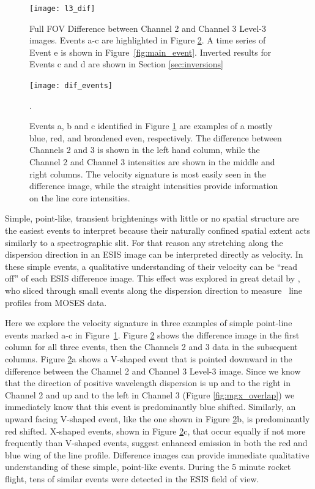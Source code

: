    		\begin{figure}[htb!]
   			\centering
   			\texttt{[image: l3\_dif]}
   			\caption{Full FOV Difference between Channel 2 and Channel 3 Level-3 images.  Events a-c are highlighted in Figure \ref{fig:dif_events}.  A time series of Event e is shown in Figure~\ref{fig:main_event}.  Inverted results for Events c and d are shown in Section \ref{sec:inversions}}
   			\label{fig:l3_dif}
   		\end{figure}
   	
 		\begin{figure}[htb!]
   			\centering
   			\texttt{[image: dif\_events]}
   			\caption{Events a, b and c identified in Figure \ref{fig:l3_dif} are examples of a mostly blue, red, and broadened even, respectively. The difference between Channels 2 and 3 is shown in the left hand column, while the Channel 2 and Channel 3 intensities are shown in the middle and right columns.  The velocity signature is most easily seen in the difference image, while the straight intensities provide information on the line core intensities. 
   			}
   			\label{fig:dif_events}. 
   		\end{figure}

    	Simple, point-like, transient brightenings with little or no spatial structure are the easiest events to interpret because their naturally confined spatial extent acts similarly to a spectrographic slit.
    	For that reason any stretching along the dispersion direction in an ESIS image can be interpreted directly as velocity. 
    	In these simple events, a qualitative understanding of their velocity can be ``read off'' of each ESIS difference image.
    	This effect was explored in great detail by \citet{Rust2019}, who sliced through small events along the dispersion direction to measure \heii \ line profiles from MOSES data.
    	
    	Here we explore the velocity signature in three examples of simple point-line events marked a-c in Figure~\ref{fig:l3_dif}.  
    	Figure \ref{fig:dif_events} shows the difference image in the first column for all three events, then the Channels 2 and 3 data in the subsequent columns. 
    	Figure \ref{fig:dif_events}a shows a V-shaped event that is pointed downward in the difference between the Channel 2 and Channel 3 Level-3 image.
    	Since we know that the direction of positive wavelength dispersion is up and to the right in Channel 2 and up and to the left in Channel 3 (Figure \ref{fig:mgx_overlap}) we immediately know that this event is predominantly blue shifted.  
    	Similarly, an upward facing V-shaped event, like the one shown in Figure \ref{fig:dif_events}b, is predominantly red shifted.
    	X-shaped events, shown in Figure \ref{fig:dif_events}c, that occur equally if not more frequently than V-shaped events, suggest enhanced emission in both the red and blue wing of the line profile.
    	Difference images can provide immediate qualitative understanding of these simple, point-like events.  
    	During the 5 minute rocket flight, tens of similar events were detected in the ESIS field of view.  
    	
